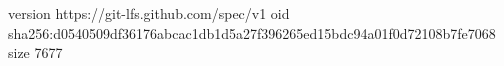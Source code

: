 version https://git-lfs.github.com/spec/v1
oid sha256:d0540509df36176abcac1db1d5a27f396265ed15bdc94a01f0d72108b7fe7068
size 7677
